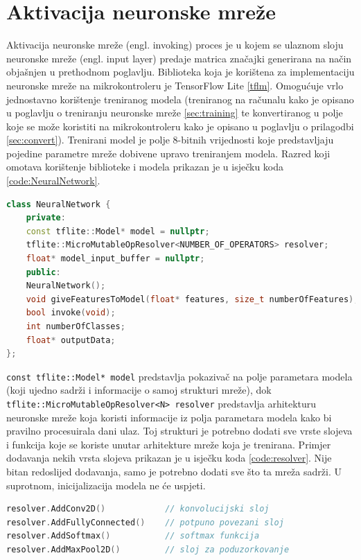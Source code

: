 \section{Aktivacija neuronske mreže}
\label{sec:activation}

Aktivacija neuronske mreže (engl. invoking) proces je u kojem se ulaznom sloju neuronske mreže 
(engl. input layer) predaje matrica značajki generirana na način objašnjen u prethodnom
poglavlju. Biblioteka koja je korištena za implementaciju
neuronske mreže na mikrokontroleru je TensorFlow Lite \ref{tflm}. Omogućuje vrlo jednostavno
korištenje treniranog modela (treniranog na računalu kako je opisano u poglavlju
o treniranju neuronske mreže \ref{sec:training} te konvertiranog
u polje koje se može koristiti na mikrokontroleru kako je opisano u poglavlju
o prilagodbi \ref{sec:convert}). Trenirani model
je polje 8-bitnih vrijednosti koje predstavljaju pojedine parametre mreže dobivene upravo 
treniranjem modela. Razred koji omotava korištenje biblioteke i modela prikazan je 
u isječku koda \ref{code:NeuralNetwork}. 

\begin{lstlisting}[language=C++, caption=Razred neuronske mreže, label=code:NeuralNetwork]
class NeuralNetwork {
    private:
    const tflite::Model* model = nullptr;
    tflite::MicroMutableOpResolver<NUMBER_OF_OPERATORS> resolver;
    float* model_input_buffer = nullptr;
    public:
    NeuralNetwork();
    void giveFeaturesToModel(float* features, size_t numberOfFeatures);
    bool invoke(void);
    int numberOfClasses;
    float* outputData;  
};   
\end{lstlisting}

\texttt{const tflite::Model* model} predstavlja 
pokazivač na polje parametara modela (koji ujedno sadrži i informacije o samoj strukturi mreže),
dok \texttt{tflite::MicroMutableOpResolver<N> resolver}
predstavlja arhitekturu neuronske mreže koja koristi informacije iz polja parametara
modela kako bi pravilno procesuirala dani ulaz. Toj strukturi je potrebno dodati sve vrste slojeva 
i funkcija koje se koriste unutar arhitekture mreže koja je trenirana. Primjer dodavanja 
nekih vrsta slojeva prikazan je u isječku koda \ref{code:resolver}. Nije bitan redoslijed 
dodavanja, samo je potrebno dodati sve što ta mreža sadrži. U suprotnom, inicijalizacija
modela ne će uspjeti.

\begin{lstlisting}[language=C++, caption=Gradnja arhitekture mreže, label=code:resolver]
resolver.AddConv2D()            // konvolucijski sloj
resolver.AddFullyConnected()    // potpuno povezani sloj
resolver.AddSoftmax()           // softmax funkcija
resolver.AddMaxPool2D()         // sloj za poduzorkovanje
\end{lstlisting}


